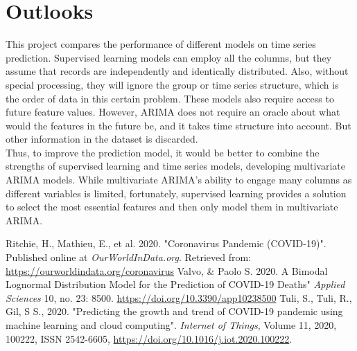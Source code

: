 \documentclass[11pt]{article}
\begin{document}
\section{Outlooks}
This project compares the performance of different models on time series prediction. Supervised learning models can employ all the columns, but they assume that records are independently and identically distributed. Also, without special processing, they will ignore the group or time series structure, which is the order of data in this certain problem. These models also require access to future feature values. However, ARIMA does not require an oracle about what would the features in the future be, and it takes time structure into account. But other information in the dataset is discarded.\\

Thus, to improve the prediction model, it would be better to combine the strengths of supervised learning and time series models, developing multivariate ARIMA models. While multivariate ARIMA's ability to engage many columns as different variables is limited, fortunately, supervised learning provides a solution to select the most essential features and then only model them in multivariate ARIMA.




\newpage
\begin{thebibliography}{99}
	Ritchie, H., Mathieu, E., et al. 2020. "Coronavirus Pandemic (COVID-19)". Published online at {\em OurWorldInData.org}. Retrieved from: \url{https://ourworldindata.org/coronavirus}
	Valvo, \& Paolo S. 2020. A Bimodal Lognormal Distribution Model for the Prediction of COVID-19 Deaths" {\em Applied Sciences }10, no. 23: 8500. \url{https://doi.org/10.3390/app10238500}
	 Tuli, S., Tuli, R., Gil, S S., 2020. "Predicting the growth and trend of COVID-19 pandemic using machine learning and cloud computing". {\em Internet of Things},
Volume 11,
2020,
100222,
ISSN 2542-6605,
	\url{https://doi.org/10.1016/j.iot.2020.100222}.
\end{thebibliography}
\end{document}
